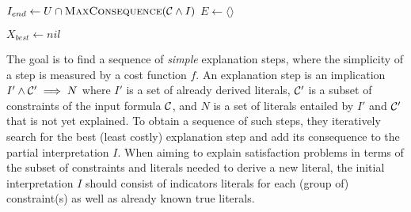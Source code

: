 \begin{algorithm}[t]
    \DontPrintSemicolon
    \caption{$\call{ExplainCSP}(\formulac, f, I, U)$}
    \label{alg:explainCSP}
    $I_{end} \gets U \cap \textsc{MaxConsequence}(\mathcal{C}  \wedge I)$ \;
    $E \gets \langle \rangle$\;
    \;
\end{algorithm}


\begin{algorithm}[t]
  \caption{$\onestep(\formulac,f,I,\Iend)$}
  \label{alg:oneStep}
$X_{best} \gets \mathit{nil}$\;
\end{algorithm}


The goal is to find a sequence of \textit{simple} explanation steps, where the simplicity of a step is measured by a cost function $f$. 
An explanation step is an implication $I' \wedge \mathcal{C} ' \implies N$ where $I'$ is a set of already derived literals, $\mathcal{C} '$ is a subset of constraints of the input formula $\mathcal{C} $, and $N$ is a set of literals entailed by $I'$ and $\mathcal{C} '$ that is not yet explained.
To obtain a sequence of such steps, they iteratively search for the best (least costly) explanation step and add its consequence to the partial interpretation $I$.
When aiming to explain satisfaction problems in terms of the subset of constraints and literals needed to derive a new literal, the initial interpretation $I$ should consist of indicators literals for each (group of) constraint(s) as well as already known true literals.

